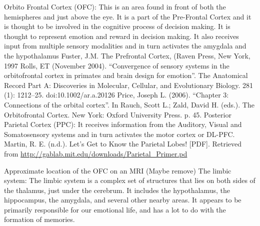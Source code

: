 \documentclass[twocolumn]{article}
\begin{document}
Orbito Frontal Cortex (OFC): This is an area found in front of both the hemispheres and just above the eye. It is a part of the Pre-Frontal Cortex and it is thought to be involved in the cognitive process of decision making. It is thought to represent emotion and reward in decision making. It also receives input from multiple sensory modalities and in turn activates the amygdala and the hypothalamus
Fuster, J.M. The Prefrontal Cortex, (Raven Press, New York, 1997
Rolls, ET (November 2004). “Convergence of sensory systems in the orbitofrontal cortex in primates and brain design for emotion”. The Anatomical Record Part A: Discoveries in Molecular, Cellular, and Evolutionary Biology. 281 (1): 1212–25. doi:10.1002/ar.a.20126
Price, Joseph L. (2006). “Chapter 3: Connections of the orbital cortex”. In Rauch, Scott L.; Zald, David H. (eds.). The Orbitofrontal Cortex. New York: Oxford University Press. p. 45.
Posterior Parietal Cortex (PPC): It receives information from the Auditory, Visual and Somatosensory systems and in turn activates the motor cortex or DL-PFC.
Martin, R. E. (n.d.). Let’s Get to Know the Parietal Lobes! [PDF]. Retrieved from \url{http://gablab.mit.edu/downloads/Parietal_Primer.pd}

Approximate location of the OFC on an MRI
(Maybe remove)
The limbic system: The limbic system is a complex set of structures that lies on both sides of the thalamus, just under the cerebrum. It includes the hypothalamus, the hippocampus, the amygdala, and several other nearby areas. It appears to be primarily responsible for our emotional life, and has a lot to do with the formation of memories.
\end{document}

